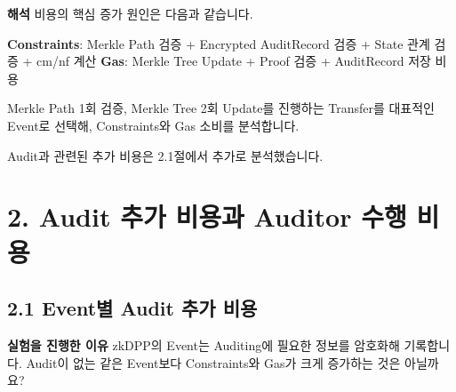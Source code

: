 \documentclass[11pt,a4paper]{article}
\begin{document}

\par\noindent\begin{minipage}{\linewidth}
    \textbf{해석}\newline
    비용의 핵심 증가 원인은 다음과 같습니다.\newline

    \textbf{Constraints}: Merkle Path 검증 + Encrypted AuditRecord 검증 + State 관계 검증 + cm/nf 계산\newline
    \textbf{Gas}: Merkle Tree Update + Proof 검증 +  AuditRecord 저장 비용\newline

    Merkle Path 1회 검증, Merkle Tree 2회 Update를 진행하는 Transfer를 대표적인 Event로 선택해, Constraints와 Gas 소비를 분석합니다.\newline

    Audit과 관련된 추가 비용은 2.1절에서 추가로 분석했습니다.\newline

    
    \noindent\begin{minipage}[t]{0.48\linewidth}
        \vspace{0pt}\centering\small
        
    \end{minipage}\hfill
    \begin{minipage}[t]{0.48\linewidth}
        \vspace{0pt}\centering\small
        
    \end{minipage}
\end{minipage}\par

\clearpage
{}\section*{2. Audit 추가 비용과 Auditor 수행 비용}

\subsection*{2.1 Event별 Audit 추가 비용}
\textbf{실험을 진행한 이유}\newline
zkDPP의 Event는 Auditing에 필요한 정보를 암호화해 기록합니다.\newline
Audit이 없는 같은 Event보다 Constraints와 Gas가 크게 증가하는 것은 아닐까요?
\end{document}
